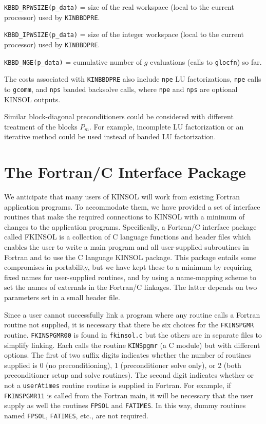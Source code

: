 \documentclass[11pt]{article}
\begin{document}
\begin{description}
\item  {\tt KBBD\_RPWSIZE(p\_data)} = size of the real workspace (local to
the current processor) used by {\tt KINBBDPRE}.

\item  {\tt KBBD\_IPWSIZE(p\_data)} = size of the integer workspace (local to
the current processor) used by {\tt KINBBDPRE}.

\item  {\tt KBBD\_NGE(p\_data)} = cumulative number of $g$ evaluations (calls
to {\tt glocfn}) so far.
\end{description}

The costs associated with {\tt KINBBDPRE} also include {\tt npe} LU
factorizations, {\tt npe} calls to {\tt gcomm}, and {\tt nps} banded
backsolve calls, where {\tt npe} and {\tt nps} are optional KINSOL
outputs.

Similar block-diagonal preconditioners could be considered with different
treatment of the blocks $P_m$. For example, incomplete LU factorization or
an iterative method could be used instead of banded LU factorization.


\section{The Fortran/C Interface Package}

We anticipate that many users of KINSOL will work from existing Fortran
application programs.  To accommodate them, we have provided a set of
interface routines that make the required connections to KINSOL with a
minimum of changes to the application programs.  Specifically, a
Fortran/C interface package called FKINSOL is a collection of C
language functions and header files which enables the user to write a
main program and all user-supplied subroutines in Fortran and to use
the C language KINSOL package.  This package entails some compromises
in portability, but we have kept these to a minimum by requiring fixed
names for user-supplied routines, and by using a name-mapping scheme
to set the names of externals in the Fortran/C linkages.  The latter
depends on two parameters set in a small header file.


Since a user cannot successfully link a program where any routine calls a 
Fortran routine not supplied, it is necessary that there be six choices for 
the {\tt FKINSPGMR} routine. {\tt FKINSPGMR00} is found in {\tt fkinsol.c} but
the others are in separate files to simplify linking. Each calls the routine 
{\tt KINSpgmr} (a C module) but with different options. The first of two suffix
digits indicates whether the number of routines supplied is 0 (no 
preconditioning), 1 (preconditioner solve only), or 2 (both preconditioner 
setup and solve routines). The second digit indicates whether or not a 
{\tt userAtimes} routine routine is supplied in Fortran. For example, if 
{\tt FKINSPGMR11} is called from the Fortran main, it will be necessary that 
the user supply as well the routines {\tt FPSOL} and {\tt FATIMES}. In this 
way, dummy routines named {\tt FPSOL}, {\tt FATIMES}, etc., are not required.
\end{document}
